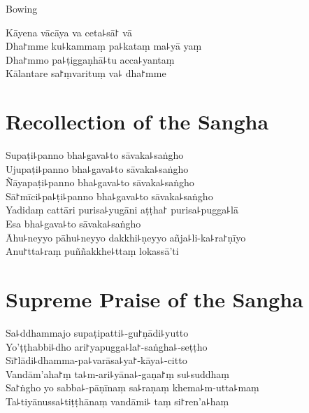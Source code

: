\clearpage

\begin{instruction}%
  Bowing
\end{instruction}

Kāyena vācāya va ceta꜕sā꜓ vā\\
Dha꜓mme ku꜕kammaṃ pa꜕kataṃ ma꜕yā yaṃ\\
Dha꜓mmo pa꜕ṭiggaṇhā꜕tu acca꜕yantaṃ\\
Kālantare sa꜓ṃvarituṃ va꜕ dha꜓mme

\chapter*{Recollection of the Sangha}%

\delegateSetUseNext

\begin{leader}
\end{leader}

Supaṭi꜕panno bha꜕gava꜕to sāvaka꜕saṅgho\\
Ujupaṭi꜕panno bha꜕gava꜕to sāvaka꜕saṅgho\\
Ñāyapaṭi꜕panno bha꜕gava꜕to sāvaka꜕saṅgho\\
Sā꜓mīci꜕pa꜕ṭi꜕panno bha꜕gava꜕to sāvaka꜕saṅgho\\
Yadidaṃ cattāri purisa꜕yugāni aṭṭha꜓ purisa꜕pugga꜕lā\\
Esa bha꜕gava꜕to sāvaka꜕saṅgho\\
Āhu꜕neyyo pāhu꜕neyyo dakkhi꜕ṇeyyo añja꜕li-ka꜕ra꜓ṇīyo\\
Anu꜓tta꜕raṃ puññakkhe꜕ttaṃ lokassā'ti

\chapter*{Supreme Praise of the Sangha}%

\begin{leader}
\end{leader}

Sa꜕ddhammajo supaṭipatti꜕-gu꜓ṇādi꜕yutto\\
Yo'ṭṭhabbi꜕dho ari꜓yapugga꜕la꜓-saṅgha꜕-seṭṭho\\
Sī꜓lādi꜕dhamma-pa꜕varāsa꜕ya꜓-kāya꜕-citto\\
Vandām'aha꜓ṃ ta꜕m-ari꜕yāna꜕-gaṇa꜓ṃ su꜕suddhaṃ\\
Sa꜓ṅgho yo sabba꜕-pāṇīnaṃ sa꜕raṇaṃ khema꜕m-utta꜕maṃ\\
Ta꜕tiyānussa꜕tiṭṭhānaṃ vandāmi꜕ taṃ si꜓ren'a꜕haṃ

